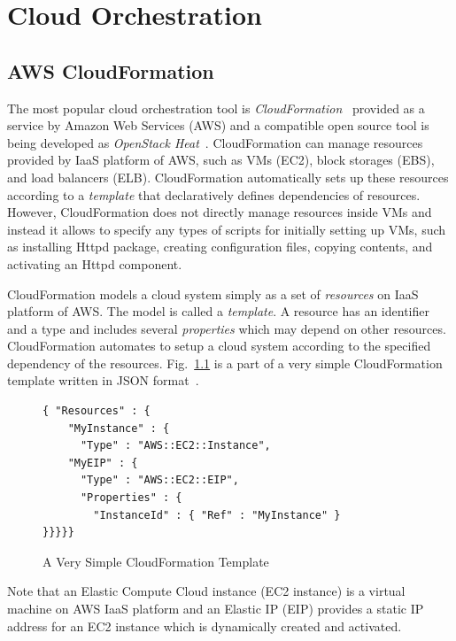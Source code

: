 \documentclass[12pt]{report}
\begin{document}
\chapter{Cloud Orchestration}
\label{chap:cloudorch}

\section{AWS CloudFormation}
\label{sec:aws}
The most popular cloud orchestration tool is {\it
  CloudFormation}~\cite{CloudFormation} provided as a service by
Amazon Web Services (AWS) and a compatible open source tool is being
developed as {\it OpenStack Heat}~\cite{Heat}. CloudFormation can
manage resources provided by IaaS platform of AWS, such as VMs (EC2),
block storages (EBS), and load balancers (ELB). CloudFormation
automatically sets up these resources according to a {\it template}
that declaratively defines dependencies of resources. However,
CloudFormation does not directly manage resources inside VMs and
instead it allows to specify any types of scripts for initially
setting up VMs, such as installing Httpd package, creating
configuration files, copying contents, and activating an Httpd
component.

CloudFormation models a cloud system simply as a set of {\it
  resources} on IaaS platform of AWS. The model is called a {\it
  template}. A resource has an identifier and a type and includes
several {\it properties} which may depend on other
resources. CloudFormation automates to setup a cloud system according
to the specified dependency of the
resources. Fig.~\ref{fig:AWSExample} is a part of a very simple
CloudFormation template written in JSON format~\cite{JSON}.
\begin{figure}
\begin{verbatim}
{ "Resources" : {
    "MyInstance" : {
      "Type" : "AWS::EC2::Instance",
    "MyEIP" : {
      "Type" : "AWS::EC2::EIP",
      "Properties" : {
        "InstanceId" : { "Ref" : "MyInstance" }
}}}}}
\end{verbatim}
\vspace{-0.6cm}
\caption{A Very Simple CloudFormation Template}
\label{fig:AWSExample}
\end{figure}
Note that an Elastic Compute Cloud instance (EC2 instance) is a
virtual machine on AWS IaaS platform and an Elastic IP (EIP)
provides a static IP address for an EC2 instance which is dynamically
created and activated.
\end{document}
